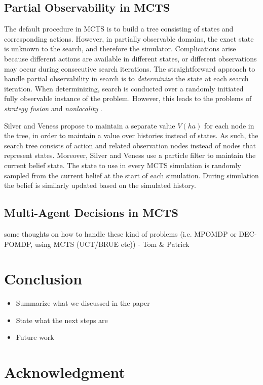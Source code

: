 \documentclass[conference]{IEEEtran}
\begin{document}
\subsection{Partial Observability in MCTS}
\label{sub:pomcts}

The default procedure in MCTS is to build a tree consisting of states and corresponding actions. However, in partially observable domains, the exact state is unknown to the search, and therefore the simulator. Complications arise because different actions are available in different states, or different observations may occur during consecutive search iterations. The straightforward approach to handle partial observability in search is to \emph{determinize} the state at each search iteration. When determinizing, search is conducted over a randomly initiated fully observable instance of the problem. However, this leads to the problems of \emph{strategy fusion} and \emph{nonlocality} \cite{cowling2012information}.


Silver and Veness \cite{silver2010monte} propose to maintain a separate value $V(ha)$ for each node in the tree, in order to maintain a value over histories instead of states. As such, the search tree consists of action and related observation nodes instead of nodes that represent states. Moreover, Silver and Veness use a particle filter to maintain the current belief state. The state to use in every MCTS simulation is randomly sampled from the current belief at the start of each simulation. During simulation the belief is similarly updated based on the simulated history.

\subsection{Multi-Agent Decisions in MCTS}
\label{sub:ma-dec-mcts}

{\red some thoughts on how to handle these kind of problems (i.e. MPOMDP or DEC-POMDP, using MCTS (UCT/BRUE etc)) - Tom \& Patrick}

\section{Conclusion}
\begin{itemize}
\item Summarize what we discussed in the paper
\item State what the next steps are
\item Future work
\end{itemize}

\section*{Acknowledgment}




\end{document}
